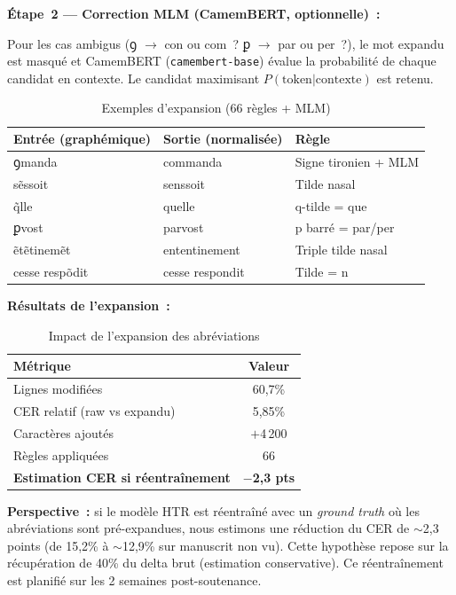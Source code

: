 \documentclass[11pt,a4paper]{article}
\begin{document}
\textbf{Étape~2 --- Correction MLM (CamemBERT, optionnelle)~:}

Pour les cas ambigus (ꝯ $\rightarrow$ con ou com~? ꝑ $\rightarrow$ par ou per~?), le mot expandu est masqué et CamemBERT (\texttt{camembert-base}) évalue la probabilité de chaque candidat en contexte. Le candidat maximisant $P(\text{token}|\text{contexte})$ est retenu.

\begin{table}[H]
\centering
\caption{Exemples d'expansion (66 règles + MLM)}
\label{tab:abbrev}
\begin{tabular}{@{}lll@{}}
\toprule
\textbf{Entrée (graphémique)} & \textbf{Sortie (normalisée)} & \textbf{Règle} \\
\midrule
ꝯmanda & commanda & Signe tironien + MLM \\
sẽssoit & senssoit & Tilde nasal \\
q̃lle & quelle & q-tilde = que \\
ꝑvost & parvost & p barré = par/per \\
ẽtẽtinemẽt & ententinement & Triple tilde nasal \\
cesse respõdit & cesse respondit & Tilde = n \\
\bottomrule
\end{tabular}
\end{table}

\textbf{Résultats de l'expansion~:}

\begin{table}[H]
\centering
\caption{Impact de l'expansion des abréviations}
\label{tab:expansion_results}
\begin{tabular}{@{}lc@{}}
\toprule
\textbf{Métrique} & \textbf{Valeur} \\
\midrule
Lignes modifiées & 60,7\% \\
CER relatif (raw vs expandu) & 5,85\% \\
Caractères ajoutés & $+$4\,200 \\
Règles appliquées & 66 \\
\midrule
\textbf{Estimation CER si réentraînement} & \textbf{$-$2,3 pts} \\
\bottomrule
\end{tabular}
\end{table}

\noindent\textbf{Perspective~:} si le modèle HTR est réentraîné avec un \textit{ground truth} où les abréviations sont pré-expandues, nous estimons une réduction du CER de $\sim$2,3 points (de 15,2\% à $\sim$12,9\% sur manuscrit non vu). Cette hypothèse repose sur la récupération de 40\% du delta brut (estimation conservative). Ce réentraînement est planifié sur les 2 semaines post-soutenance.
\end{document}
